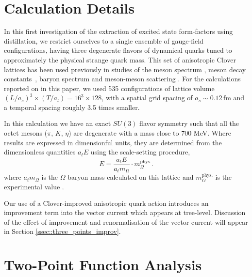 \documentclass[twocolumn,amsmath,amssymb,prd,10pt,floatfix, 
superscriptaddress,nofootinbib, showpacs, preprintnumbers]{revtex4-1}
\begin{document}
%
\section{Calculation Details \label{sec::calc_details}}

In this first investigation of the extraction of excited state form-factors using distillation, we restrict ourselves to a single ensemble of gauge-field configurations, having three degenerate flavors of dynamical quarks tuned to approximately the physical strange quark mass. This set of anisotropic Clover lattices \cite{Edwards:2008ja, Lin:2008pr} has been used previously in studies of the meson spectrum \cite{Dudek:2009qf,Dudek:2010wm,Dudek:2011tt,Liu:2012ze,Dudek:2013yja}, 
meson decay constants~\cite{Mastropas:2014fsa},
baryon spectrum 
\cite{Edwards:2011jj, Dudek:2012ag, Edwards:2012fx, Padmanath:2013zfa} 
and meson-meson scattering 
\cite{Dudek:2010ew,Dudek:2012gj,Dudek:2012xn,Dudek:2014qha}. 
For the calculations reported on in this paper, we used 535 configurations of lattice volume $(L/a_s)^3 \times (T/a_t) = 16^3\times 128$, with a spatial grid spacing of $a_s \sim 0.12\, \mathrm{fm}$ and a temporal spacing roughly 3.5 times smaller. 

In this calculation we have an exact $SU(3)$ flavor symmetry such that all the octet mesons ($\pi$, $K$, $\eta$) are degenerate with a mass close to $700$ MeV. Where results are expressed in dimensionful units, they are determined from the dimensionless quantities $a_t E$ using the scale-setting procedure,
\begin{equation*}
E = \frac{a_t E}{a_t m_\Omega} \cdot m_\Omega^{\mathrm{phys.}}.
\end{equation*}
where $a_t m_\Omega$ is the $\Omega$ baryon mass calculated on this lattice and $m_\Omega^{\mathrm{phys.}}$ is the experimental value \cite{PDG-2012}.

Our use of a Clover-improved anisotropic quark action introduces an improvement term into the vector current which appears at tree-level. Discussion of the effect of improvement and renormalisation of the vector current will appear in Section \ref{ssec::three_points_improv}.



%
\section{Two-Point Function Analysis\label{sec::two_points}} 
\end{document}
